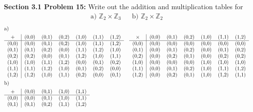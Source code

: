 \documentclass[12pt]{article}
\begin{document}
\newpage 

\noindent \textbf{Section 3.1 Problem 15: } Write out the addition and multiplication tables for 
	\begin{align*}
		\text{a) } \mathbb{Z}_2 \times \mathbb{Z}_3 && \text{b) } \mathbb{Z}_2 \times \mathbb{Z}_2 
	\end{align*}
	\begin{align*}
		&\text{a)} \\
		&\begin{tabular}{c | c c c c c c}
			+ & (0,0) & (0,1) & (0,2) & (1,0) & (1,1) & (1,2) \\
			\hline 
			(0,0) & (0,0) & (0,1) & (0,2) & (1,0) & (1,1) & (1,2) \\
			(0,1) & (0,1) & (0,2) & (0,0) & (1,1) & (1,2) & (1,0) \\
			(0,2) & (0,2) & (0,0) & (0,1) & (1,2) & (1,0) & (1,1) \\
			(1,0) & (1,0) & (1,1) & (1,2) & (0,0) & (0,1) & (0,2) \\	
			(1,1) & (1,1) & (1,2) & (1,0) & (0,1) & (0,2) & (0,0) \\
			(1,2) & (1,2) & (1,0) & (1,1) & (0,2) & (0,0) & (0,1) \\	
		\end{tabular}	
		\quad 	
		\begin{tabular}{c | c c c c c c}
			\text{$\times$} & (0,0) & (0,1) & (0,2) & (1,0) & (1,1) & (1,2) \\
			\hline 
			(0,0) & (0,0) & (0,0) & (0,0) & (0,0) & (0,0) & (0,0) \\
			(0,1) & (0,0) & (0,1) & (0,2) & (0,0) & (0,1) & (0,2) \\
			(0,2) & (0,0) & (0,2) & (0,1) & (0,0) & (0,2) & (0,2) \\
			(1,0) & (0,0) & (0,0) & (0,0) & (1,0) & (1,0) & (1,0) \\	
			(1,1) & (0,0) & (0,1) & (0,2) & (1,0) & (1,1) & (1,2) \\
			(1,2) & (0,0) & (0,2) & (0,1) & (1,0) & (1,2) & (1,1) \\	
		\end{tabular} \\
		&\text{b)} \\
		&\begin{tabular}{c | c c c c }
			+ & (0,0) & (0,1) & (1,0) & (1,1) \\
			\hline 
			(0,0) & (0,0) & (0,1) & (1,0) & (1,1) \\
			(0,1) & (0,1) & (0,2) & (1,1) & (1,2) \\

\end{tabular}
\end{align*}
\end{document}
